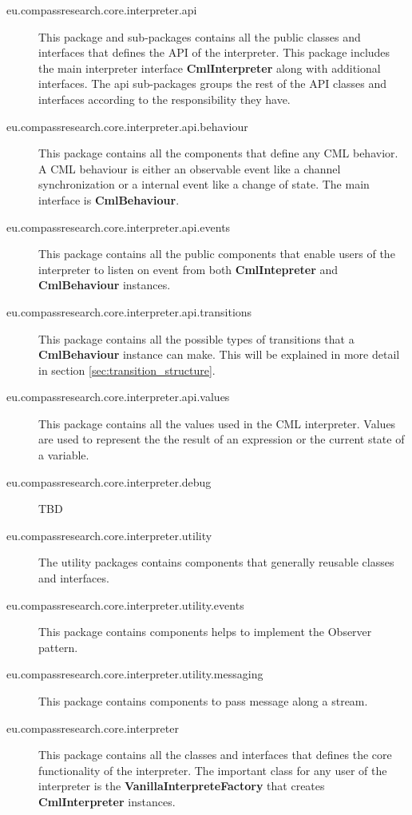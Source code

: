\documentclass[a4paper, 12pt]{include/compassreport}   %
\begin{document}
\begin{description}
\item[eu.compassresearch.core.interpreter.api] This package and
  sub-packages contains all the public classes and interfaces that
  defines the API of the interpreter. This package includes the main
  interpreter interface \textbf{CmlInterpreter} along with additional
  interfaces.
  The api sub-packages groups the rest of the API classes and
  interfaces according to the responsibility they have.

\item[eu.compassresearch.core.interpreter.api.behaviour] This package
  contains all the components that define any CML behavior. A CML
  behaviour is either an observable event like a channel synchronization
  or a internal event like a change of state. The main interface is
  \textbf{CmlBehaviour}.

\item[eu.compassresearch.core.interpreter.api.events] This package
  contains all the public components that enable users of the
  interpreter to listen on event from both \textbf{CmlIntepreter} and
  \textbf{CmlBehaviour} instances.

\item[eu.compassresearch.core.interpreter.api.transitions] This
  package contains all the possible types of transitions that a
  \textbf{CmlBehaviour} instance can make. This will be explained in
  more detail in section \ref{sec:transition_structure}.

\item[eu.compassresearch.core.interpreter.api.values] This package
  contains all the values used in the CML interpreter. Values are used
  to represent the the result of an expression or the current state of a
  variable.

\item[eu.compassresearch.core.interpreter.debug] TBD

\item[eu.compassresearch.core.interpreter.utility] The utility
packages contains components that generally reusable classes and
interfaces. 

\item[eu.compassresearch.core.interpreter.utility.events] This package
contains components helps to implement the Observer pattern. 

\item[eu.compassresearch.core.interpreter.utility.messaging] This
  package contains components to pass message along a stream.



\item[eu.compassresearch.core.interpreter] This package contains all
  the classes and interfaces that defines the core functionality of the
  interpreter. The important class for any user of the interpreter is
  the \textbf{VanillaInterpreteFactory} that creates
  \textbf{CmlInterpreter} instances.

\end{description}
\end{document}
